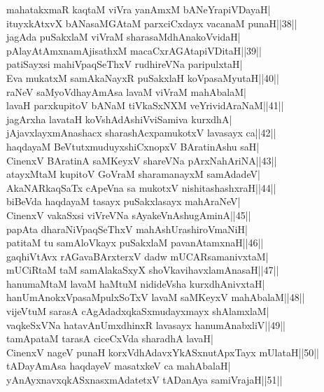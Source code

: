 \documentclass{article}
\begin{document}
mahatakxmaR kaqtaM viVra yanAmxM bANeYrapiVDayaH|\\
ituyxkAtxvX bANasaMGAtaM parxciCxdayx vacanaM punaH||38||\\
jagAda puSakxlaM viVraM sharasaMdhAnakoVvidaH|\\
pAlayAtAmxnamAjisathxM macaCxrAGAtapiVDitaH||39||\\
patiSayxsi mahiVpaqSeThxV rudhireVNa paripulxtaH|\\
Eva mukatxM samAkaNayxR puSakxlaH koVpasaMyutaH||40||\\
raNeV saMyoVdhayAmAsa lavaM viVraM mahAbalaM|\\
lavaH parxkupitoV bANaM tiVkaSxNXM veYrividAraNaM||41||\\
jagArxha lavataH koVshAdAshiVviSamiva kurxdhA|\\
jAjavxlayxmAnashacx sharashAcxpamukotxV lavasayx ca||42||\\
haqdayaM BeVtutxmuduyxshiCxnopxV BAratinAshu saH|\\
CinenxV BAratinA saMKeyxV shareVNa pArxNahAriNA||43||\\
atayxMtaM kupitoV GoVraM   sharamanayxM samAdadeV|\\
AkaNARkaqSaTx cApeVna sa mukotxV nishitashashxraH||44||\\
biBeVda haqdayaM tasayx puSakxlasayx mahAraNeV|\\
CinenxV vakaSxsi viVreVNa sAyakeVnAshugAminA||45||\\
papAta dharaNiVpaqSeThxV mahAshUrashiroVmaNiH|\\
patitaM tu samAloVkayx puSakxlaM pavanAtamxnaH||46||\\
gaqhiVtAvx rAGavaBArxterxV dadw mUCARsamanivxtaM|\\
mUCiRtaM taM samAlakaSxyX shoVkavihavxlamAnasaH||47||\\
hanumaMtaM lavaM haMtuM nidideVsha kurxdhAnivxtaH|\\
hanUmAnokxVpasaMpulxSoTxV lavaM saMKeyxV mahAbalaM||48||\\
vijeVtuM sarasA cAgAdadxqkaSxmudayxmayx shAlamxlaM|\\
vaqkeSxVNa hatavAnUmxdhinxR lavasayx hanumAnabxliV||49||\\
tamApataM tarasA ciceCxVda sharadhA lavaH|\\
CinenxV nageV punaH korxVdhAdavxYkASxnutApxTayx mUlataH||50||\\
tADayAmAsa haqdayeV masatxkeV ca mahAbalaH|\\
yAnAyxnavxqkASxnasxmAdatetxV tADanAya samiVrajaH||51||\\
\end{document}
